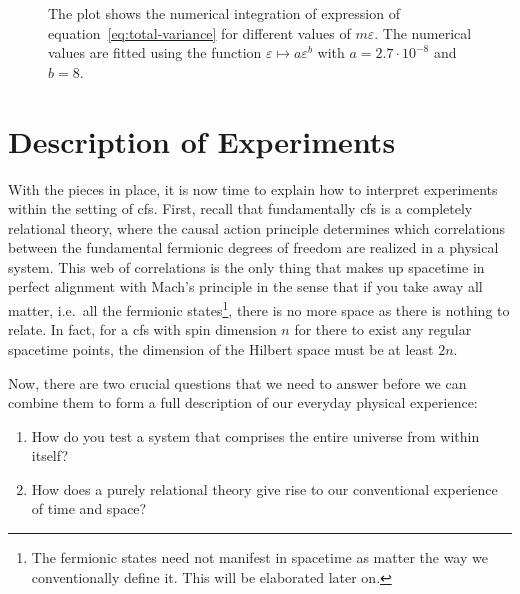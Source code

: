 \documentclass[reqno,11pt]{amsart}
\numberwithin{equation}{section}
\begin{document}
\begin{figure}
    \label{fig:total-variance}
    
    \caption{
        The plot shows the numerical integration of expression of equation~\eqref{eq:total-variance} for different values
        of $m \varepsilon$.
        The numerical values are fitted using the function $\varepsilon \mapsto a \varepsilon^b$ with $a = 2.7 \cdot 10^{-8}$ and $b = 8$.
    }
\end{figure}
    
\section{Description of Experiments}\label{sec:experiment}

With the pieces in place, it is now time to explain how to interpret experiments within the setting of \ac{cfs}.
First, recall that fundamentally \ac{cfs} is a completely relational theory, where the causal action principle determines
which correlations between the fundamental fermionic degrees of freedom are realized in a physical system.
This web of correlations is the only thing that makes up spacetime in perfect alignment with Mach's principle in the sense
that if you take away all matter, i.e.~all the fermionic states\footnote{
    The fermionic states need not manifest in spacetime as matter the way we conventionally define it.
    This will be elaborated later on.
}, there is no more space as there is nothing to relate.
In fact, for a \ac{cfs} with spin dimension $n$ for there to exist any regular spacetime points, the dimension of the
Hilbert space must be at least $2n$.

Now, there are two crucial questions that we need to answer before we can combine them to form a full description of our everyday
physical experience:
\begin{enumerate}
    \item How do you test a system that comprises the entire universe from within itself?
    \item How does a purely relational theory give rise to our conventional experience of time and space?
\end{enumerate}
\end{document}
